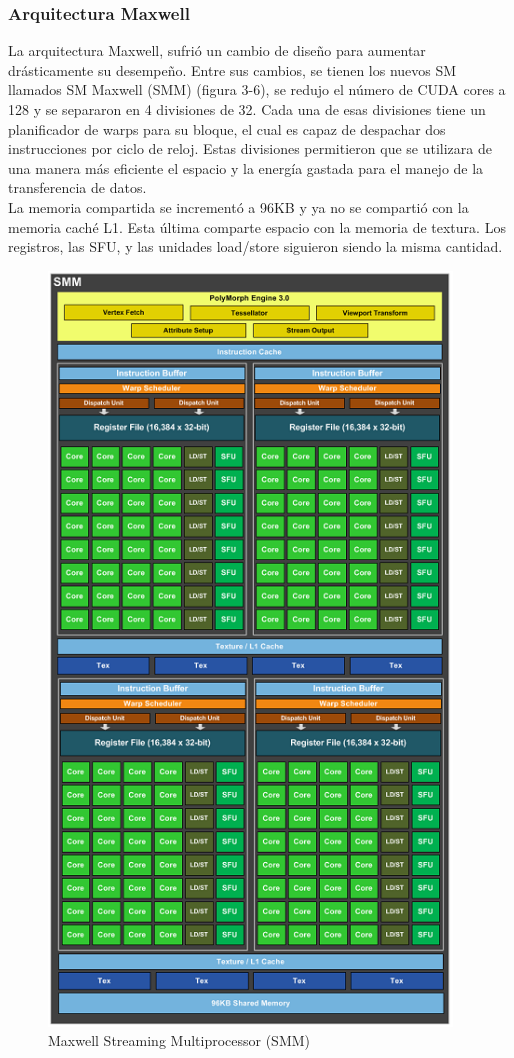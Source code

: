 \subsubsection{Arquitectura Maxwell}
La arquitectura Maxwell\cite{Maxwell}, sufrió un cambio de diseño para aumentar drásticamente su desempeño. Entre sus cambios, se tienen los nuevos SM llamados SM Maxwell (SMM) (figura 3-6), se redujo el número de CUDA cores a 128 y se separaron en 4 divisiones de 32. Cada una de esas divisiones tiene un planificador de warps para su bloque, el cual es capaz de despachar dos instrucciones por ciclo de reloj. Estas divisiones permitieron que se utilizara de una manera más eficiente el espacio y la energía gastada para el manejo de la transferencia de datos.\\
La memoria compartida se incrementó a 96KB y ya no se compartió con la memoria caché L1. Esta última comparte espacio con la memoria de textura. Los registros, las SFU, y las unidades load/store siguieron siendo la misma cantidad.
\begin{figure}[H]
                      \centering
                              \includegraphics[height=20cm]{img/MaxwellSM.png}
                      \caption{Maxwell Streaming Multiprocessor (SMM) \cite{Maxwell}}
\end{figure}
